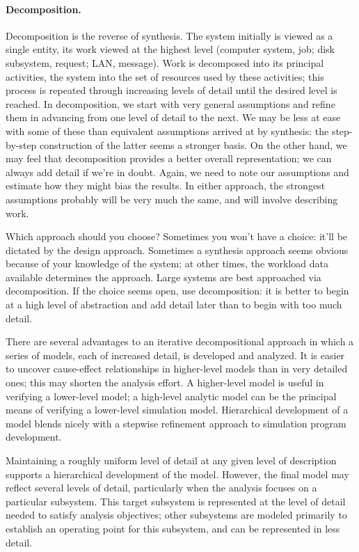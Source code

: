 \paragraph{Decomposition.}
Decomposition is the reverse of synthesis. The system initially is viewed as a
single entity, its work viewed at the highest level (computer system, job; disk
subsystem, request; LAN, message). Work is decomposed into its principal
activities, the system into the set of resources used by these activities; this
process is repeated through increasing levels of detail until the desired level
is reached. In decomposition, we start with very general assumptions and
refine them in advancing from one level of detail to the next. We may be less
at ease with some of these than equivalent assumptions arrived at by
synthesis: the step-by-step construction of the latter seems a stronger basis.
On the other hand, we may feel that decomposition provides a better overall
representation; we can always add detail if we're in doubt. Again, we need to
note our assumptions and estimate how they might bias the results. In either
approach, the strongest assumptions probably will be very much the same, and
will involve describing work.

Which approach should you choose? Sometimes you won't have a choice: it'll be
dictated by the design approach. Sometimes a synthesis approach seems obvious
because of your knowledge of the system; at other times, the workload data
available determines the approach. Large systems are best approached via
decomposition. If the choice seems open, use decomposition: it is better to
begin at a high level of abstraction and add detail later than to begin with
too much detail.

There are several advantages to an iterative decompositional approach in which
a series of models, each of increased detail, is developed and analyzed. It is
easier to uncover cause-effect relationships in higher-level models than in
very detailed ones; this may shorten the analysis effort. A higher-level model
is useful in verifying a lower-level model; a high-level analytic model can be
the principal means of verifying a lower-level simulation model. Hierarchical
development of a model blends nicely with a stepwise refinement approach to
simulation program development.

Maintaining a roughly uniform level of detail at any given level of
description supports a hierarchical development of the model. However, the
final model may reflect several levels of detail, particularly when the
analysis focuses on a particular subsystem. This target subsystem is
represented at the level of detail needed to satisfy analysis objectives; other
subsystems are modeled primarily to establish an operating point for this
subsystem, and can be represented in less detail.

